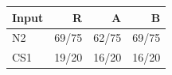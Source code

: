 \begin{tabular}{lrrr}
\toprule
Input & R & A & B \\
\midrule
N2 & 69/75 & 62/75 & 69/75 \\
CS1 & 19/20 & 16/20 & 16/20 \\
\bottomrule
\end{tabular}
